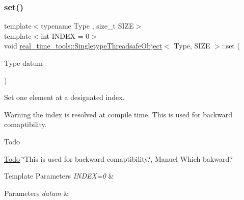 \subsubsection{\texorpdfstring{set()}{set()}\hspace{0.1cm}{\footnotesize\ttfamily [2/3]}}
{\footnotesize\ttfamily template$<$typename Type , size\+\_\+t S\+I\+ZE$>$ \\
template$<$int I\+N\+D\+EX = 0$>$ \\
void \hyperlink{classreal__time__tools_1_1SingletypeThreadsafeObject}{real\+\_\+time\+\_\+tools\+::\+Singletype\+Threadsafe\+Object}$<$ Type, S\+I\+ZE $>$\+::set (\begin{DoxyParamCaption}\item[{Type}]{datum }\end{DoxyParamCaption})\hspace{0.3cm}{\ttfamily [inline]}}



Set one element at a designated index. 

Warning the index is resolved at compile time. This is used for backward comaptibility. \begin{DoxyRefDesc}{Todo}
\item[\hyperlink{todo__todo000003}{Todo}]\char`\"{}\+This is used for backward comaptibility.\char`\"{}, Manuel Which bakward?\end{DoxyRefDesc}



\begin{DoxyTemplParams}{Template Parameters}
{\em I\+N\+D\+E\+X=0} & \\
\hline
\end{DoxyTemplParams}

\begin{DoxyParams}{Parameters}
{\em datum} & \\
\hline
\end{DoxyParams}
\mbox{\label{classreal__time__tools_1_1SingletypeThreadsafeObject_ab5776496cf4fa4a015101c81811eb9fc}} 
